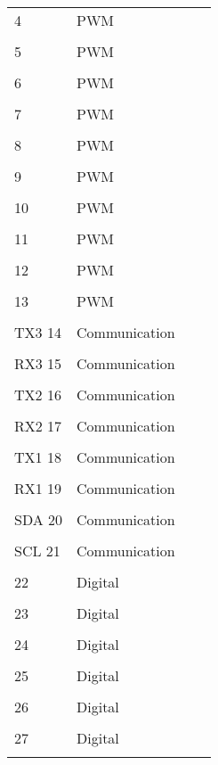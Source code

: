 \documentclass{article}
\begin{document}
\begin{longtable}{|l|l|l|l|}
4&PWM&&\\&&&\\ \hline
5&PWM&&\\&&&\\ \hline
6&PWM&&\\&&&\\ \hline
7&PWM&&\\&&&\\ \hline
8&PWM&&\\&&&\\ \hline
9&PWM&&\\ &&&\\\hline
10&PWM&&\\&&&\\ \hline
11&PWM&&\\&&&\\ \hline
12&PWM&&\\&&&\\ \hline
13&PWM&&\\&&&\\ \hline
TX3 14&Communication&&\\&&&\\ \hline
RX3 15&Communication&&\\&&&\\ \hline
TX2 16&Communication&&\\ &&&\\\hline
RX2 17&Communication&&\\&&&\\ \hline
TX1 18&Communication&&\\&&&\\ \hline
RX1 19&Communication&&\\&&&\\ \hline
SDA 20&Communication&&\\&&&\\ \hline
SCL 21&Communication&&\\&&&\\ \hline
22&Digital&&\\&&&\\ \hline
23&Digital&&\\ &&&\\\hline
24&Digital&&\\ &&&\\\hline
25&Digital&&\\ &&&\\\hline
26&Digital&&\\ &&&\\\hline
27&Digital&&\\ &&&\\\hline

\end{longtable}
\end{document}
